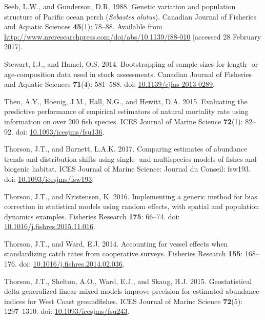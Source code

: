 \documentclass[12pt,]{article}
\begin{document}
\hypertarget{ref-seeb_genetic_1988}{}
Seeb, L.W., and Gunderson, D.R. 1988. Genetic variation and population
structure of Pacific ocean perch (\emph{Sebastes alutus}). Canadian
Journal of Fisheries and Aquatic Sciences \textbf{45}(1): 78--88.
Available from
\url{http://www.nrcresearchpress.com/doi/abs/10.1139/f88-010}
{[}accessed 28 February 2017{]}.

\hypertarget{ref-stewart_bootstrapping_2014}{}
Stewart, I.J., and Hamel, O.S. 2014. Bootstrapping of sample sizes for
length- or age-composition data used in stock assessments. Canadian
Journal of Fisheries and Aquatic Sciences \textbf{71}(4): 581--588. doi:
\href{https://doi.org/10.1139/cjfas-2013-0289}{10.1139/cjfas-2013-0289}.

\hypertarget{ref-then_evaluating_2015}{}
Then, A.Y., Hoenig, J.M., Hall, N.G., and Hewitt, D.A. 2015. Evaluating
the predictive performance of empirical estimators of natural mortality
rate using information on over 200 fish species. ICES Journal of Marine
Science \textbf{72}(1): 82--92. doi:
\href{https://doi.org/10.1093/icesjms/fsu136}{10.1093/icesjms/fsu136}.

\hypertarget{ref-thorson_comparing_2017}{}
Thorson, J.T., and Barnett, L.A.K. 2017. Comparing estimates of
abundance trends and distribution shifts using single- and multispecies
models of fishes and biogenic habitat. ICES Journal of Marine Science:
Journal du Conseil: fsw193. doi:
\href{https://doi.org/10.1093/icesjms/fsw193}{10.1093/icesjms/fsw193}.

\hypertarget{ref-thorson_implementing_2016}{}
Thorson, J.T., and Kristensen, K. 2016. Implementing a generic method
for bias correction in statistical models using random effects, with
spatial and population dynamics examples. Fisheries Research
\textbf{175}: 66--74. doi:
\href{https://doi.org/10.1016/j.fishres.2015.11.016}{10.1016/j.fishres.2015.11.016}.

\hypertarget{ref-thorson_accounting_2014}{}
Thorson, J.T., and Ward, E.J. 2014. Accounting for vessel effects when
standardizing catch rates from cooperative surveys. Fisheries Research
\textbf{155}: 168--176. doi:
\href{https://doi.org/10.1016/j.fishres.2014.02.036}{10.1016/j.fishres.2014.02.036}.

\hypertarget{ref-thorson_geostatistical_2015}{}
Thorson, J.T., Shelton, A.O., Ward, E.J., and Skaug, H.J. 2015.
Geostatistical delta-generalized linear mixed models improve precision
for estimated abundance indices for West Coast groundfishes. ICES
Journal of Marine Science \textbf{72}(5): 1297--1310. doi:
\href{https://doi.org/10.1093/icesjms/fsu243}{10.1093/icesjms/fsu243}.
\end{document}
